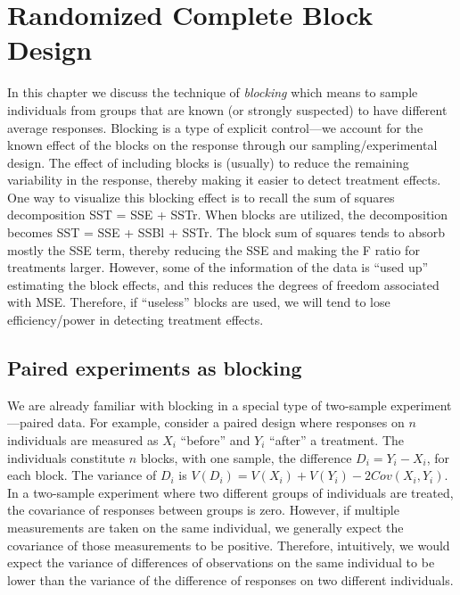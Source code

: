 \documentclass[
]{book}
\begin{document}
\hypertarget{randomized-complete-block-design}{%
\chapter{Randomized Complete Block Design}\label{randomized-complete-block-design}}

In this chapter we discuss the technique of \emph{blocking} which means to sample individuals from groups that are known (or strongly suspected) to have different average responses. Blocking is a type of explicit control---we account for the known effect of the blocks on the response through our sampling/experimental design. The effect of including blocks is (usually) to reduce the remaining variability in the response, thereby making it easier to detect treatment effects. One way to visualize this blocking effect is to recall the sum of squares decomposition SST = SSE + SSTr. When blocks are utilized, the decomposition becomes SST = SSE + SSBl + SSTr. The block sum of squares tends to absorb mostly the SSE term, thereby reducing the SSE and making the F ratio for treatments larger. However, some of the information of the data is ``used up'' estimating the block effects, and this reduces the degrees of freedom associated with MSE. Therefore, if ``useless'' blocks are used, we will tend to lose efficiency/power in detecting treatment effects.

\hypertarget{paired-experiments-as-blocking}{%
\section{Paired experiments as blocking}\label{paired-experiments-as-blocking}}

We are already familiar with blocking in a special type of two-sample experiment---paired data. For example, consider a paired design where responses on \(n\) individuals are measured as \(X_i\) ``before'' and \(Y_i\) ``after'' a treatment. The individuals constitute \(n\) blocks, with one sample, the difference \(D_i = Y_i - X_i\), for each block. The variance of \(D_i\) is \(V(D_i) = V(X_i) + V(Y_i) - 2Cov(X_i, Y_i)\). In a two-sample experiment where two different groups of individuals are treated, the covariance of responses between groups is zero. However, if multiple measurements are taken on the same individual, we generally expect the covariance of those measurements to be positive. Therefore, intuitively, we would expect the variance of differences of observations on the same individual to be lower than the variance of the difference of responses on two different individuals.
\end{document}
